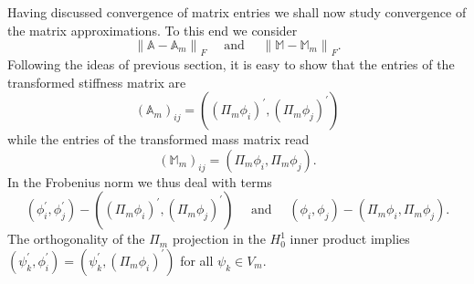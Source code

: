 \documentclass[a4paper,10pt]{article}
\newcommand{\R}{\ensuremath{\mathbb{R}}}
\newcommand{\norm}[1]{\ensuremath{\left\|#1\right\|}}
\newcommand{\inner}[2]{\ensuremath{\left(#1, #2\right)}}
\newcommand{\Amat}{\ensuremath{\mathbb{A}}}
\newcommand{\Bmat}{\ensuremath{\mathbb{B}}}
\newcommand{\Mmat}{\ensuremath{\mathbb{M}}}
\newcommand{\Ammat}{\ensuremath{\mathbb{A}_m}}               %
\newcommand{\Mmmat}{\ensuremath{\mathbb{M}_m}}               %
\newcommand{\TODO}[1]{\textcolor{red}{#1}}
\begin{document}
  Having discussed convergence of matrix entries we shall now study convergence
  of the matrix approximations. To this end we consider
  \[
  \norm{\Amat-\Ammat}_F\quad\text{ and }\quad\norm{\Mmat-\Mmmat}_F.
  \]
  Following the ideas of previous section, it is easy to show that the entries
  of the transformed stiffness matrix are  
  \[
    \left(\Ammat\right)_{ij} =
    \inner{\left(\Pi_m\phi_i\right)^{\prime}}
    {\left(\Pi_m\phi_j\right)^{\prime}}
  \]
  while the entries of the transformed mass matrix read
  \[
    \left(\Mmmat\right)_{ij} = \inner{\Pi_m\phi_i}
                                     {\Pi_m\phi_j}.
  \]
  In the Frobenius norm we thus deal with terms
  \[
    \inner{\phi^{\prime}_i}{\phi^{\prime}_j} - 
    \inner{\left(\Pi_m\phi_i\right)^{\prime}}
          {\left(\Pi_m\phi_j\right)^{\prime}}
    \quad\text{ and }\quad
    \inner{\phi_i}{\phi_j} - \inner{\Pi_m\phi_i}{\Pi_m\phi_j}.
  \]
  The orthogonality of the $\Pi_m$ projection in the $H^1_0$ inner product
  implies $\inner{\psi^{\prime}_k}{\phi^{\prime}_i}=
  \inner{\psi^{\prime}_k}{\left(\Pi_m\phi_i\right)^{\prime}}
  $ for all $\psi_k\in V_m$.
% 
\end{document}
